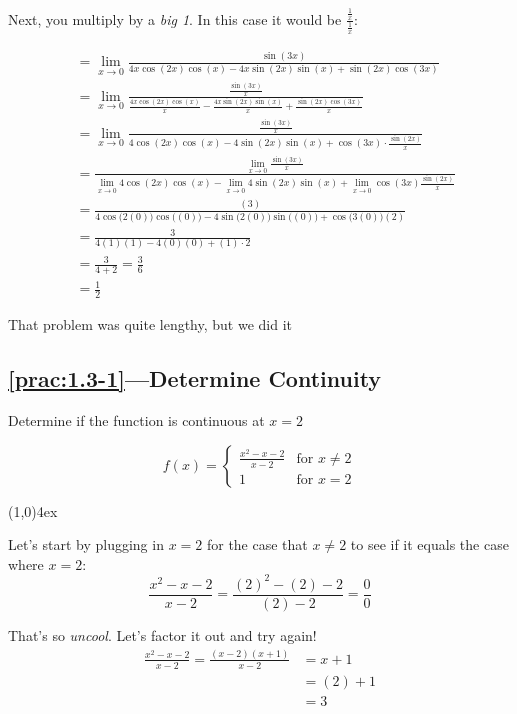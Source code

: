 \documentclass{MathNotes}
\newcommand{\br}{
\begin{center}
\line(1,0){4ex}
\end{center}}
\begin{document}
Next, you multiply by a \textit{big 1}. In this case it would be
$\displaystyle\frac{\frac{1}{x}}{\frac{1}{x}}$:

\begin{align*}
    &=\lim_{x\to 0}\frac{\sin(3x)}{4x\cos(2x)\cos(x)-4x\sin(2x)\sin(x)+\sin(2x)\cos(3x)}\\
    &=\lim_{x\to 0}\frac{\frac{\sin(3x)}{x}}{\frac{4x\cos(2x)\cos(x)}{x}-\frac{4x\sin(2x)\sin(x)}{x}+\frac{\sin(2x)\cos(3x)}{x}}\\
    &=\lim_{x\to 0}\frac{\frac{\sin(3x)}{x}}{4\cos(2x)\cos(x)-4\sin(2x)\sin(x)+\cos(3x)\cdot\frac{\sin(2x)}{x}}\\
    &=\frac{\lim_{x\to 0}\frac{\sin(3x)}{x}}{\lim_{x\to 0}4\cos(2x)\cos(x)-\lim_{x\to 0}4\sin(2x)\sin(x)+\lim_{x\to 0}\cos(3x)\frac{\sin(2x)}{x}}\\
    &=\frac{(3)}{4\cos\big(2(0)\big)\cos\big((0)\big)-4\sin\big(2(0)\big)\sin\big((0)\big)+\cos\big(3(0)\big)(2)}\\
    &=\frac{3}{4(1)(1)-4(0)(0)+(1)\cdot 2}\\
    &=\frac{3}{4+2}=\frac{3}{6}\\
    &=\frac{1}{2}
\end{align*}

That problem was quite lengthy, but we did it 

\newpage
\subsection*{\ref{prac:1.3-1}---Determine Continuity}\label{ans:1.3-1}
Determine if the function is continuous at $x=2$

\begin{displaymath}
    f(x) = \begin{cases}
        \frac{x^2-x-2}{x-2} &\text{for } x\neq 2\\
        1 &\text{for } x=2
    \end{cases}
\end{displaymath}
\br

Let's start by plugging in $x=2$ for the case that $x\neq2$ to see if it equals
the case where $x=2$:
\begin{displaymath}
    \frac{x^2-x-2}{x-2}=\frac{(2)^2-(2)-2}{(2)-2}=\frac{0}{0}
\end{displaymath}

That's so \textit{uncool}. Let's factor it out and try again!
\begin{align*}
    \frac{x^2-x-2}{x-2} = \frac{(x-2)(x+1)}{x-2} &= x+1\\
    &=(2)+1\\
    &=3
\end{align*}
\end{document}

